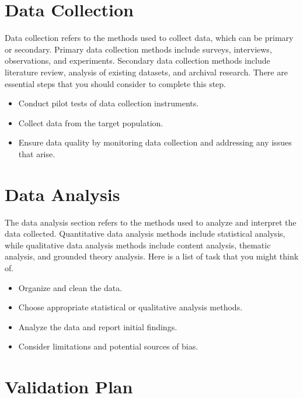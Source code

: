 
\section{Data Collection}
\label{sec:data_collection}

Data collection refers to the methods used to collect data, which can be primary or secondary. Primary data collection methods include surveys, interviews, observations, and experiments. Secondary data collection methods include literature review, analysis of existing datasets, and archival research. There are essential steps that you should consider to complete this step.

\begin{itemize}
    \item Conduct pilot tests of data collection instruments.
    \item Collect data from the target population.
    \item Ensure data quality by monitoring data collection and addressing any issues that arise.
\end{itemize}


\section{Data Analysis}
\label{sec:data_analysis}

The data analysis section refers to the methods used to analyze and interpret the data collected. Quantitative data analysis methods include statistical analysis, while qualitative data analysis methods include content analysis, thematic analysis, and grounded theory analysis.
Here is a list of task that you might think of.

\begin{itemize}
    \item Organize and clean the data.
    \item Choose appropriate statistical or qualitative analysis methods.
    \item Analyze the data and report initial findings.
    \item Consider limitations and potential sources of bias.
\end{itemize}



\section{Validation Plan}
\label{sec:validation_plan}

